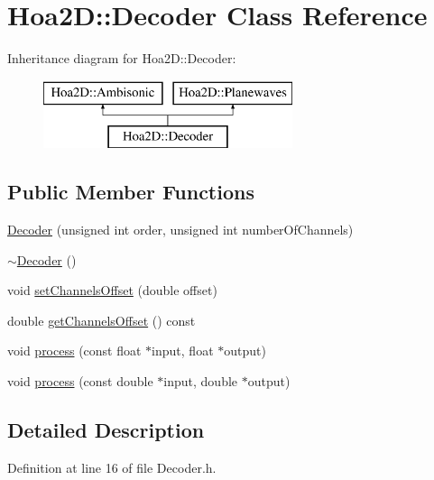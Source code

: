 \hypertarget{class_hoa2_d_1_1_decoder}{\section{Hoa2\-D\-:\-:Decoder Class Reference}
\label{class_hoa2_d_1_1_decoder}
}
Inheritance diagram for Hoa2\-D\-:\-:Decoder\-:\begin{figure}[H]
\begin{center}
\leavevmode
\includegraphics[height=2.000000cm]{class_hoa2_d_1_1_decoder}
\end{center}
\end{figure}
\subsection*{Public Member Functions}
\begin{DoxyCompactItemize}
\item 
\hyperlink{class_hoa2_d_1_1_decoder_a90db2fd2ed005b15bb38b3cda88b3417}{Decoder} (unsigned int order, unsigned int number\-Of\-Channels)
\item 
\hyperlink{class_hoa2_d_1_1_decoder_a2ad3a9bafe6f452bcb378eabd53e0876}{$\sim$\-Decoder} ()
\item 
void \hyperlink{class_hoa2_d_1_1_decoder_ac7365c9cb3e3e60d6051aa6a7dba3eea}{set\-Channels\-Offset} (double offset)
\item 
double \hyperlink{class_hoa2_d_1_1_decoder_a9e25d2f72129bb9cae477f74d761a438}{get\-Channels\-Offset} () const 
\item 
void \hyperlink{class_hoa2_d_1_1_decoder_a68f00b02c0f8697ecd5364f772bcc9c0}{process} (const float $\ast$input, float $\ast$output)
\item 
void \hyperlink{class_hoa2_d_1_1_decoder_ab3ed928a777ea379b4fa02f65be7e996}{process} (const double $\ast$input, double $\ast$output)
\end{DoxyCompactItemize}


\subsection{Detailed Description}


Definition at line 16 of file Decoder.\-h.



